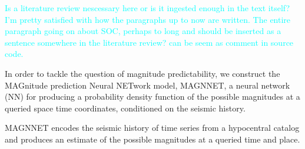 \documentclass[pdflatex]{sn-jnl}
\newcommand{\neri}[1]{{\textcolor{cyan}{#1}}}
\begin{document}
\neri{Is a literature review nescessary here or is it ingested enough in the text itself? I'm pretty satisfied with how the paragraphs up to now are written.}\newline
\neri{The entire paragraph going on about SOC, perhaps to long and should be inserted as a sentence somewhere in the literature review? can be seem as comment in source code.}



In order to tackle the question of magnitude predictability, we construct the MAGnitude prediction Neural NETwork model, MAGNNET, a neural network (NN) for producing a probability density function of the possible magnitudes at a queried space time coordinates, conditioned on the seismic history.

MAGNNET encodes the seismic history of time series from a hypocentral catalog and produces an estimate of the possible magnitudes at a queried time and place.
\end{document}
